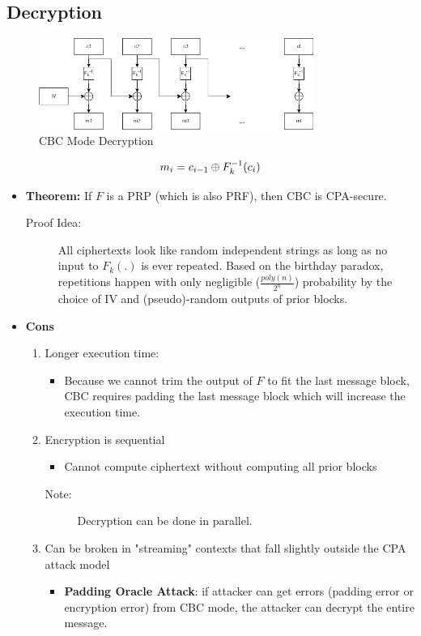 \documentclass{scribe}
\begin{document}
\subsection{Decryption}
\begin{figure}[H]
  \centering
  \includegraphics[width=0.8\textwidth]{cbc2.jpg}
  \caption{CBC Mode Decryption}
\end{figure}
\begin{equation}
      m_i = c_{i-1} \oplus F_k^{-1}(c_i)\\
\end{equation}
\begin{itemize}
    \item \textbf{Theorem:} If $F$ is a PRP (which is also PRF), then CBC is CPA-secure. 
    \begin{description}
        \item [Proof Idea:] All ciphertexts look like random independent strings as long as no input to $F_k(.)$ is ever repeated. Based on the birthday paradox, repetitions happen with only negligible ($\frac{poly(n)}{2^{n}}$) probability by the choice of IV and (pseudo)-random outputs of prior blocks.
    \end{description}
    \item \textbf{Cons}
\begin{enumerate}
    \item Longer execution time:
    \begin{itemize}
        \item Because we cannot trim the output of $F$ to fit the last message block, CBC requires padding the last message block which will increase the execution time.
    \end{itemize}
    \item Encryption is sequential
    \begin{itemize}
        \item Cannot compute ciphertext without computing all prior blocks
    \end{itemize}
    \begin{description}
        \item [Note:] Decryption can be done in parallel.
    \end{description}
    \item Can be broken in "streaming" contexts that fall slightly outside the CPA attack model
    \begin{itemize}
        \item \textbf{Padding Oracle Attack}: if attacker can get errors (padding error or encryption error) from CBC mode, the attacker can decrypt the entire message.
    \end{itemize}
\end{enumerate}
\end{itemize}
\end{document}
